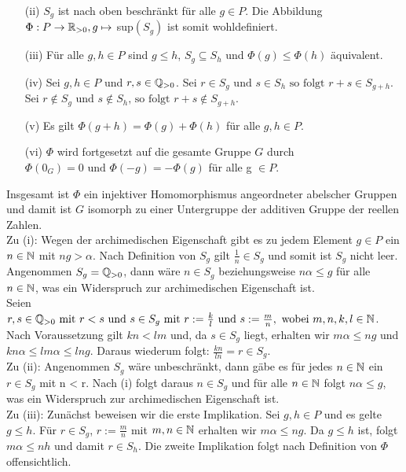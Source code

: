 {\begin{enumerate}
\item[(ii)] $S_g$ ist nach oben beschränkt für alle $g \in P$. Die Abbildung $\Phi: P \rightarrow \mathbb{R}_{>0}, g \mapsto$ sup$\left( S_g \right)$ ist somit wohldefiniert.  
\item[(iii)]Für alle $g, h \in P$ sind $g \le h $, $ S_g \subseteq S_h$ und $\Phi(g) \le \Phi(h)$ äquivalent.  
\item[(iv)] Sei $g, h \in P$ und $r,s \in \mathbb{Q}_{>0}$. Sei $r \in S_g \text{ und } s \in S_h \text{ so folgt } r+s \in S_{g+h}$. \\
Sei $r \notin S_g \text{ und } s \notin S_h \text{, so folgt } r+s \notin S_{g+h}$. 
\item[(v)] Es gilt $\Phi\left( g+h\right) = \Phi\left(g\right) + \Phi\left(h\right)$ für alle $g, h \in P$. 
\item[(vi)] $\Phi$ wird fortgesetzt auf die gesamte Gruppe $G$ durch $\Phi\left(0_G\right) = 0 \text{ und } \Phi \left(-g\right) = -\Phi \left(g\right)$ für alle g $\in P$. \\ 
\end{enumerate}
Insgesamt ist $\Phi$ ein injektiver Homomorphismus angeordneter abelscher Gruppen und damit ist $G$ isomorph zu einer Untergruppe der additiven Gruppe der reellen Zahlen.\\ 
Zu (i): Wegen der archimedischen Eigenschaft gibt es zu jedem Element $g \in P$ ein $n \in \mathbb{N}$ mit $ng > \alpha$. Nach Definition von $S_g$ gilt $\frac{1}{n} \in S_g$ und somit ist $S_g$ nicht leer.\\ Angenommen $S_g = \mathbb{Q}_{>0}$, dann wäre $n \in S_g$ beziehungsweise $n\alpha \le g$ für alle $n\in\mathbb{N}$, was ein Widerspruch zur archimedischen Eigenschaft ist.\\
Seien $r, s \in \mathbb{Q}_{>0} \text{ mit } r < s \text{ und } s \in S_g \text { mit } r := \frac{k}{l} \text{ und } s:= \frac{m}{n}, \text{ wobei } m, n ,k, l \in \mathbb{N}$. Nach Voraussetzung gilt $kn < lm $ und, da $s \in S_g$ liegt, erhalten wir $ m\alpha \le ng$ und $kn\alpha \le lm\alpha \le lng.$ Daraus wiederum folgt: $\frac{kn}{ln} = r \in S_g$.\\
%
%
% 
%
Zu (ii): Angenommen $S_g$ wäre unbeschränkt, dann gäbe es für jedes $n \in \mathbb{N}$ ein $r \in S_g$ mit n < r. Nach (i) folgt daraus $n \in S_g$ und für alle $n \in \mathbb{N}$ folgt $ n\alpha \le g$, was ein Widerspruch zur archimedischen Eigenschaft ist.\\
%
%
%
%
%
Zu (iii): Zunächst beweisen wir die erste Implikation. Sei  $g, h \in P$ und es gelte $g \le h$. Für $r \in S_g$, $r:= \frac{m}{n}$ mit $m, n \in \mathbb{N} $ erhalten wir $m\alpha \le ng$. Da $g \le h$ ist, folgt $ m\alpha \le n h$ und damit $r \in S_h$. Die zweite Implikation folgt nach Definition von $\Phi$ offensichtlich.\\
}
